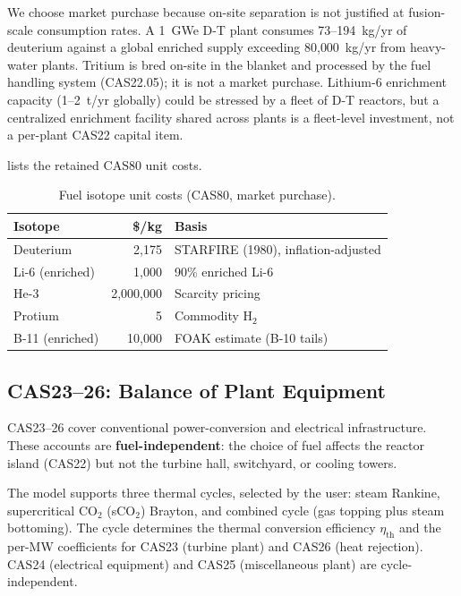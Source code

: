 \documentclass{article}
\begin{document}
We choose market purchase because on-site separation is not justified
at fusion-scale consumption rates. A 1~GWe D-T plant consumes
73--194~kg/yr of deuterium against a global enriched supply exceeding
80{,}000~kg/yr from heavy-water plants. Tritium is bred on-site in the
blanket and processed by the fuel handling system (CAS22.05); it is not a
market purchase. Lithium-6 enrichment capacity (1--2~t/yr
globally) could be stressed by a fleet of D-T reactors, but a
centralized enrichment facility shared across plants is a fleet-level
investment, not a per-plant CAS22 capital item.

 lists the retained CAS80 unit costs.

\begin{table}[htbp]
\caption{Fuel isotope unit costs (CAS80, market purchase).}
\label{tab:fuel-prices}
\centering
\begin{tabular}{lrl}
\toprule
Isotope & \$/kg & Basis \\
\midrule
Deuterium & 2{,}175 & STARFIRE (1980), inflation-adjusted \\
Li-6 (enriched) & 1{,}000 & 90\% enriched Li-6 \\
He-3 & 2{,}000{,}000 & Scarcity pricing \\
Protium & 5 & Commodity H$_2$ \\
B-11 (enriched) & 10{,}000 & FOAK estimate (B-10 tails) \\
\bottomrule
\end{tabular}
\end{table}


\subsection{CAS23--26: Balance of Plant Equipment}
\label{sec:cas23-26}

CAS23--26 cover conventional power-conversion and electrical infrastructure.
These accounts are \textbf{fuel-independent}: the choice of fuel
affects the reactor island (CAS22) but not the turbine hall, switchyard,
or cooling towers.

The model supports three thermal cycles, selected by the user: steam
Rankine, supercritical CO$_2$ (sCO$_2$) Brayton, and combined cycle
(gas topping plus steam bottoming).  The cycle determines the thermal
conversion efficiency $\eta_{\text{th}}$ and the per-MW coefficients for
CAS23 (turbine plant) and CAS26 (heat rejection).  CAS24 (electrical
equipment) and CAS25 (miscellaneous plant) are cycle-independent.
\end{document}

